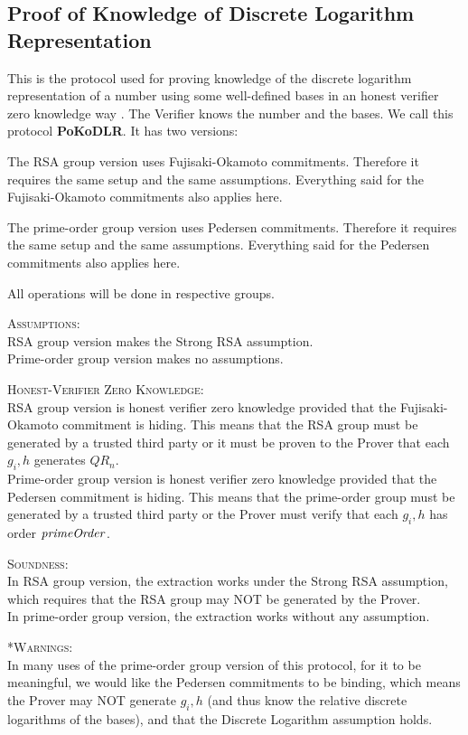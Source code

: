 \subsection{Proof of Knowledge of Discrete Logarithm Representation}\label{sec-PoKoDLR}

This is the protocol used for proving knowledge of the discrete logarithm
representation of a number using some well-defined bases in an honest verifier
zero knowledge way \cite{schnorr:sigs:joc91}. The Verifier knows the number and the bases. We call this protocol \textbf{PoKoDLR}. It has two versions:

The RSA group version uses Fujisaki-Okamoto commitments. Therefore it requires the same setup and the same assumptions. Everything said for the Fujisaki-Okamoto commitments also applies here.

The prime-order group version uses Pedersen commitments. Therefore it requires the same setup and the same assumptions. Everything said for the Pedersen commitments also applies here.

All operations will be done in respective groups.


\textsc{Assumptions}:\\
RSA group version makes the Strong RSA assumption.\\
Prime-order group version makes no assumptions.


\textsc{Honest-Verifier Zero Knowledge}:\\
RSA group version is honest verifier zero knowledge provided that the Fujisaki-Okamoto commitment is hiding. This means that the RSA group must be generated by a trusted third party or it must be proven to the Prover that each $g_i,h$ generates $QR_n$.\\
Prime-order group version is honest verifier zero knowledge provided that the Pedersen commitment is hiding. This means that the prime-order group must be generated by a trusted third party or the Prover must verify that each $g_i,h$ has order $ \mathit{primeOrder} $.



\textsc{Soundness}:\\
In RSA group version, the extraction works under the Strong RSA assumption, which requires that the RSA group may NOT be generated by the Prover.\\
In prime-order group version, the extraction works without any assumption.



\textsc{*Warnings}:\\
In many uses of the prime-order group version of this protocol, for it to be meaningful, we would like the Pedersen commitments to be binding, which means the Prover may NOT generate $g_i,h$ (and thus know the relative discrete logarithms of the bases), and that the Discrete Logarithm assumption holds.



